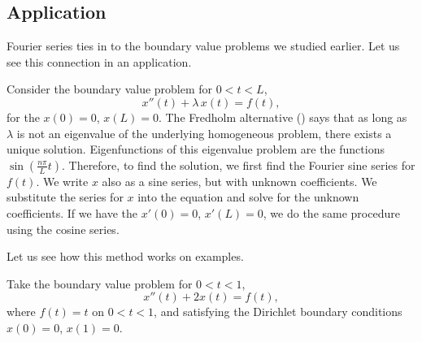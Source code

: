 \documentclass{ximera}
\begin{document}
\subsection{Application}

Fourier series ties in to the boundary value problems we studied earlier.  Let us see this connection in an application.

Consider the boundary value problem for $0 < t < L$,
\begin{equation*}
    x''(t) + \lambda\, x(t) = f(t) ,
\end{equation*}
for the \emph{} $x(0) = 0$, $x(L) = 0$. The Fredholm alternative () says that as long as $\lambda$ is not an eigenvalue of the underlying homogeneous problem, there exists a unique solution. Eigenfunctions of this eigenvalue problem are the functions $\sin \left( \frac{n \pi}{L} t \right)$. Therefore, to find the solution, we first find the Fourier sine series for $f(t)$. We write $x$ also as a sine series, but with unknown coefficients. We substitute the series for $x$ into the equation and solve for the unknown coefficients. If we have the \emph{} $x'(0) = 0$, $x'(L) = 0$, we do the same procedure using the cosine series.

Let us see how this method works on examples.

\begin{example}
    Take the boundary value problem for $0 < t < 1$,
    \begin{equation*}
        x''(t) + 2 x(t) = f(t) ,
    \end{equation*}
    where $f(t) = t$ on $0 < t < 1$, and satisfying the Dirichlet boundary conditions $x(0) = 0$, $x(1)=0$.
\end{example}
\end{document}
